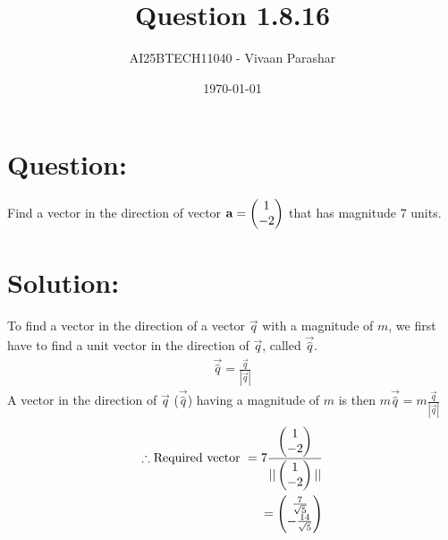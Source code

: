 \documentclass[a4paper, 12pt]{article}
\title{Question 1.8.16}
\author{AI25BTECH11040 - Vivaan Parashar}
\date{\today}
\begin{document}
\maketitle

\section{Question: }
Find a vector in the direction of vector $\mathbf{a} = \begin{pmatrix}1 \\ -2\end{pmatrix}$ that has magnitude 7 units.

\section{Solution: }
To find a vector in the direction of a vector $\vec{q}$ with a magnitude of $m$, we first have to find a unit vector in the direction of $\vec{q}$, called $\vec{\hat{q}}$.
\begin{align}
    \vec{\hat{q}} = \frac{\vec{q}}{|\vec{q}|}
\end{align}
A vector in the direction of $\vec{q}$ ($\vec{\hat{q}}$) having a magnitude of $m$ is then $m \vec{\hat{q}} = m\frac{\vec{q}}{|\vec{q}|}$
\begin{align}
    \therefore \text{Required vector } = 7\frac{\begin{pmatrix}1 \\ -2\end{pmatrix}}{||\begin{pmatrix}1 \\ -2\end{pmatrix}||}\\
    = \begin{pmatrix}\frac{7}{\sqrt{5}} \\ - \frac{14}{\sqrt{5}}\end{pmatrix}
\end{align}
\end{document}
